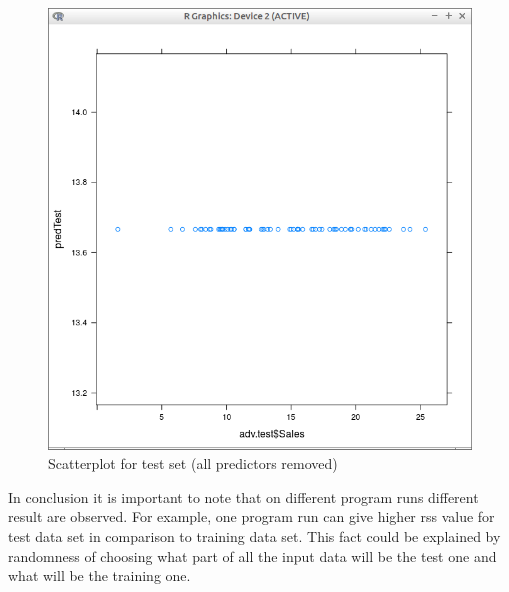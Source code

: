 \documentclass[10pt,a4paper]{article}
\begin{document}
\begin{figure}[H]
\centering
\includegraphics[width=140mm]{figures/pltIntTest.png}
\caption{Scatterplot for test set (all predictors removed) \label{overflow}}
\end{figure}

In conclusion it is important to note that on different program runs different result are observed. For example, one program run can give higher rss value for test data set in comparison to training data set. This fact could be explained by randomness of choosing what part of all the input data will be the test one and what will be the training one.
\end{document}
